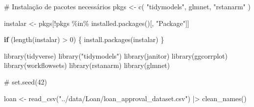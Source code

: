 \documentclass[
  letterpaper,
  DIV=11,
  numbers=noendperiod]{scrartcl}
\author{}
\date{}
\newenvironment{Shaded}{\begin{snugshade}}{\end{snugshade}}
\newcommand{\CommentTok}[1]{\textcolor[rgb]{0.37,0.37,0.37}{#1}}
\newcommand{\ControlFlowTok}[1]{\textcolor[rgb]{0.00,0.23,0.31}{\textbf{#1}}}
\newcommand{\DecValTok}[1]{\textcolor[rgb]{0.68,0.00,0.00}{#1}}
\newcommand{\FunctionTok}[1]{\textcolor[rgb]{0.28,0.35,0.67}{#1}}
\newcommand{\NormalTok}[1]{\textcolor[rgb]{0.00,0.23,0.31}{#1}}
\newcommand{\OtherTok}[1]{\textcolor[rgb]{0.00,0.23,0.31}{#1}}
\newcommand{\SpecialCharTok}[1]{\textcolor[rgb]{0.37,0.37,0.37}{#1}}
\newcommand{\StringTok}[1]{\textcolor[rgb]{0.13,0.47,0.30}{#1}}
\begin{document}
\begin{Shaded}
\begin{Highlighting}[]
\CommentTok{\# Instalação de pacotes necessários}
\NormalTok{pkgs }\OtherTok{\textless{}{-}} \FunctionTok{c}\NormalTok{(}
  \StringTok{"tidymodels"}\NormalTok{,}
  \StringTok{\textquotesingle{}glmnet\textquotesingle{}}\NormalTok{,}
  \StringTok{"rstanarm"}
\NormalTok{)}

\NormalTok{instalar }\OtherTok{\textless{}{-}}\NormalTok{ pkgs[}\SpecialCharTok{!}\NormalTok{pkgs }\SpecialCharTok{\%in\%} \FunctionTok{installed.packages}\NormalTok{()[, }\StringTok{"Package"}\NormalTok{]]}

\ControlFlowTok{if}\NormalTok{ (}\FunctionTok{length}\NormalTok{(instalar) }\SpecialCharTok{\textgreater{}} \DecValTok{0}\NormalTok{) \{}
  \FunctionTok{install.packages}\NormalTok{(instalar)}
\NormalTok{\}}
\end{Highlighting}
\end{Shaded}

\begin{Shaded}
\begin{Highlighting}[]
\FunctionTok{library}\NormalTok{(tidyverse)}
\FunctionTok{library}\NormalTok{(}\StringTok{"tidymodels"}\NormalTok{)}
\FunctionTok{library}\NormalTok{(}\StringTok{\textquotesingle{}janitor\textquotesingle{}}\NormalTok{)}
\FunctionTok{library}\NormalTok{(}\StringTok{\textquotesingle{}ggcorrplot\textquotesingle{}}\NormalTok{)}
\FunctionTok{library}\NormalTok{(workflowsets)}
\FunctionTok{library}\NormalTok{(rstanarm)}
\FunctionTok{library}\NormalTok{(glmnet)}
\end{Highlighting}
\end{Shaded}

\begin{Shaded}
\begin{Highlighting}[]
\CommentTok{\#}
\FunctionTok{set.seed}\NormalTok{(}\DecValTok{42}\NormalTok{)}
\end{Highlighting}
\end{Shaded}

\begin{Shaded}
\begin{Highlighting}[]
\NormalTok{loan }\OtherTok{\textless{}{-}} \FunctionTok{read\_csv}\NormalTok{(}\StringTok{"../data/Loan/loan\_approval\_dataset.csv"}\NormalTok{) }\SpecialCharTok{|\textgreater{}}
  \FunctionTok{clean\_names}\NormalTok{()}
\end{Highlighting}
\end{Shaded}
\end{document}
